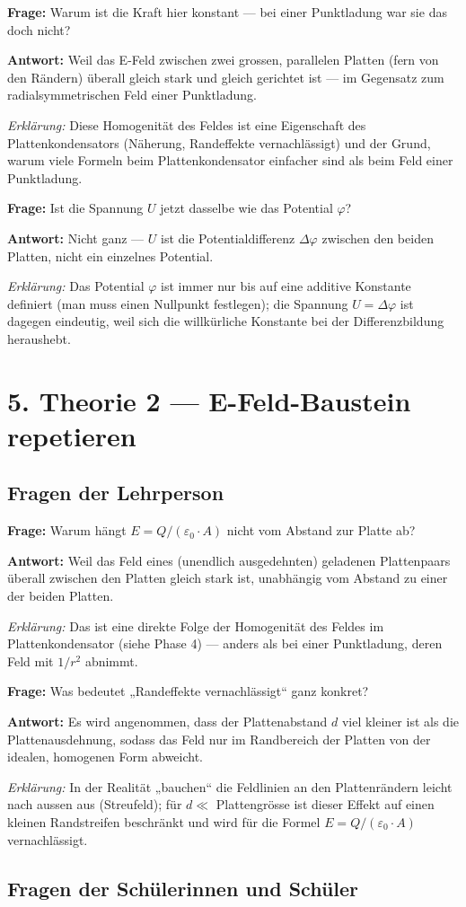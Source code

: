 \documentclass[11pt,a4paper]{article}
\newcommand{\Frage}[1]{\textbf{Frage:} #1\par}
\newcommand{\Antwort}[1]{\textbf{Antwort:} #1\par}
\newcommand{\Erklaerung}[1]{\textit{Erklärung:} #1}
\newcommand{\FrageBlock}[3]{\Frage{#1}\Antwort{#2}\Erklaerung{#3}\vspace{0.6em}}
\begin{document}
\FrageBlock{Warum ist die Kraft hier konstant --- bei einer Punktladung war sie das doch nicht?}
{Weil das E-Feld zwischen zwei grossen, parallelen Platten (fern von den Rändern) überall gleich stark und gleich gerichtet ist --- im Gegensatz zum radialsymmetrischen Feld einer Punktladung.}
{Diese Homogenität des Feldes ist eine Eigenschaft des Plattenkondensators (Näherung, Randeffekte vernachlässigt) und der Grund, warum viele Formeln beim Plattenkondensator einfacher sind als beim Feld einer Punktladung.}

\FrageBlock{Ist die Spannung $U$ jetzt dasselbe wie das Potential $\varphi$?}
{Nicht ganz --- $U$ ist die Potentialdifferenz $\Delta\varphi$ zwischen den beiden Platten, nicht ein einzelnes Potential.}
{Das Potential $\varphi$ ist immer nur bis auf eine additive Konstante definiert (man muss einen Nullpunkt festlegen); die Spannung $U=\Delta\varphi$ ist dagegen eindeutig, weil sich die willkürliche Konstante bei der Differenzbildung heraushebt.}

\section*{5. Theorie 2 --- E-Feld-Baustein repetieren}

\subsection*{Fragen der Lehrperson}

\FrageBlock{Warum hängt $E=Q/(\varepsilon_0\cdot A)$ nicht vom Abstand zur Platte ab?}
{Weil das Feld eines (unendlich ausgedehnten) geladenen Plattenpaars überall zwischen den Platten gleich stark ist, unabhängig vom Abstand zu einer der beiden Platten.}
{Das ist eine direkte Folge der Homogenität des Feldes im Plattenkondensator (siehe Phase 4) --- anders als bei einer Punktladung, deren Feld mit $1/r^2$ abnimmt.}

\FrageBlock{Was bedeutet „Randeffekte vernachlässigt“ ganz konkret?}
{Es wird angenommen, dass der Plattenabstand $d$ viel kleiner ist als die Plattenausdehnung, sodass das Feld nur im Randbereich der Platten von der idealen, homogenen Form abweicht.}
{In der Realität „bauchen“ die Feldlinien an den Plattenrändern leicht nach aussen aus (Streufeld); für $d \ll$ Plattengrösse ist dieser Effekt auf einen kleinen Randstreifen beschränkt und wird für die Formel $E=Q/(\varepsilon_0\cdot A)$ vernachlässigt.}

\subsection*{Fragen der Schülerinnen und Schüler}
\end{document}
